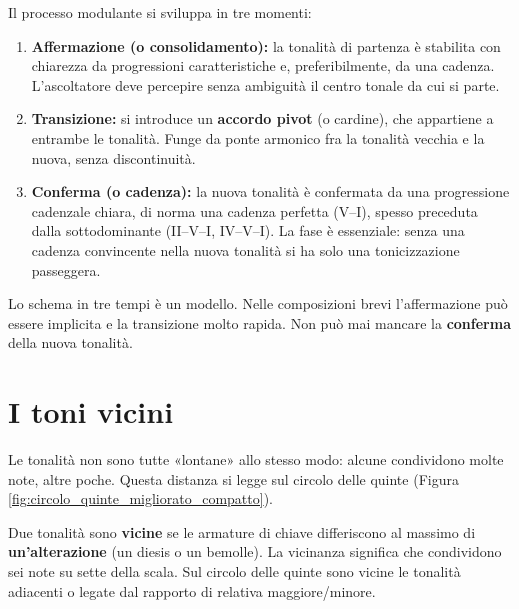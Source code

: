 \begin{regola}
	\label{reg:tre_fasi_modulazione}
	Il processo modulante si sviluppa in tre momenti:
	\begin{enumerate}
		\item \textbf{Affermazione (o consolidamento):} la tonalità di partenza è stabilita con chiarezza da progressioni caratteristiche e, preferibilmente, da una cadenza. L'ascoltatore deve percepire senza ambiguità il centro tonale da cui si parte.

		\item \textbf{Transizione:} si introduce un \textbf{accordo pivot} (o cardine), che appartiene a entrambe le tonalità. Funge da ponte armonico fra la tonalità vecchia e la nuova, senza discontinuità.

		\item \textbf{Conferma (o cadenza):} la nuova tonalità è confermata da una progressione cadenzale chiara, di norma una cadenza perfetta (V--I), spesso preceduta dalla sottodominante (II--V--I, IV--V--I). La fase è essenziale: senza una cadenza convincente nella nuova tonalità si ha solo una tonicizzazione passeggera.
	\end{enumerate}
\end{regola}

Lo schema in tre tempi è un modello. Nelle composizioni brevi l'affermazione può essere implicita e la transizione molto rapida. Non può mai mancare la \textbf{conferma} della nuova tonalità.

\section{I toni vicini}
\label{sec:toni_vicini}

Le tonalità non sono tutte «lontane» allo stesso modo: alcune condividono molte note, altre poche. Questa distanza si legge sul circolo delle quinte (Figura \ref{fig:circolo_quinte_migliorato_compatto}).

\begin{definizione}
	\label{def:tonalita_vicine}
	Due tonalità sono \textbf{vicine} se le armature di chiave differiscono al massimo di \textbf{un'alterazione} (un diesis o un bemolle). La vicinanza significa che condividono sei note su sette della scala. Sul circolo delle quinte sono vicine le tonalità adiacenti o legate dal rapporto di relativa maggiore/minore.
\end{definizione}

